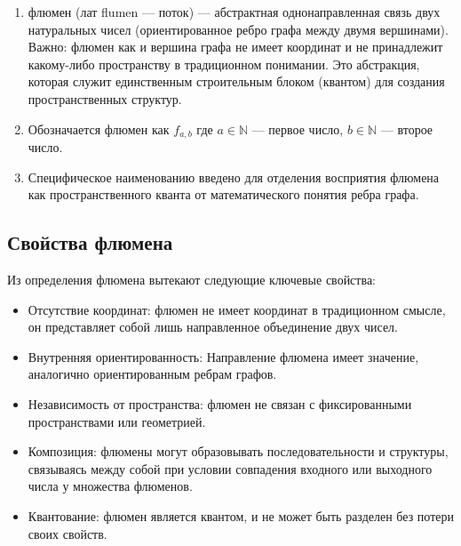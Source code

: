 \documentclass[final]{article}
\begin{document}
        \begin{enumerate}

            \item флюмен (лат flumen — поток) — абстрактная однонаправленная 
            связь двух натуральных чисел (ориентированное ребро графа между 
            двумя вершинами). Важно: флюмен как и вершина графа не имеет 
            координат и не принадлежит какому-либо пространству в традиционном 
            понимании. Это абстракция, которая служит единственным строительным 
            блоком (квантом) для создания пространственных структур.

            \item Обозначается флюмен как \( f_{a,b} \) где \( a \in \mathbb{N} \) — 
            первое число, \( b \in \mathbb{N} \) — второе число.

            \item Специфическое наименованию введено для отделения восприятия 
            флюмена как пространственного кванта от математического понятия ребра 
            графа.

        \end{enumerate}



    \subsection{Свойства флюмена}

        Из определения флюмена вытекают следующие ключевые свойства:
        \begin{itemize}
            \item Отсутствие координат: флюмен не имеет координат в традиционном 
            смысле, он представляет собой лишь направленное объединение двух 
            чисел.
            \item Внутренняя ориентированность: Направление флюмена имеет 
            значение, аналогично ориентированным ребрам графов.
            \item Независимость от пространства: флюмен не связан с фиксированными
            пространствами или геометрией.
            \item Композиция: флюмены могут образовывать последовательности и 
            структуры, связываясь между собой при условии совпадения входного 
            или выходного числа у множества флюменов.
            \item Квантование: флюмен является квантом, и не может быть разделен 
            без потери своих свойств.
        \end{itemize}
\end{document}
